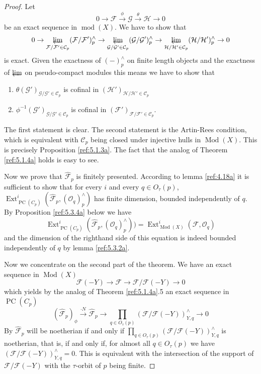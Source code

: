 \documentclass{amsproc}
\def\Cscr{{\mathcal C}}
\def\Fscr{{\mathcal F}}
\def\Gscr{{\mathcal G}}
\def\Hscr{{\mathcal H}}
\def\Oscr{{\mathcal O}}
\def\Ext{\operatorname {Ext}}
\def\coh{\operatorname {mod}}
\def\Qch{\operatorname {Mod}}
\def\r{\rightarrow}
\let\invlim\projlim
\DeclareMathOperator{\PC}{PC}
\theoremstyle{definition}
\theoremstyle{remark}
\def\invlim{\mathop{\vtop{\baselineskip -100pt\lineskip -1pt\lineskiplimit 0pt
\setbox0\hbox{\upshape lim}\copy0\hbox to \wd0{\leftarrowfill}}}\limits}
\numberwithin{equation}{section}
\numberwithin{table}{section}
\numberwithin{figure}{section}
\begin{document}
\begin{proof}
Let 
\[
0\r \Fscr\xrightarrow{\phi} \Gscr\xrightarrow{\theta} \Hscr\r 0
\]
be an exact sequence in $\coh(X)$. We have to show that 
\[
0\r \invlim_{\Fscr/\Fscr'\in\Cscr_p} (\Fscr/\Fscr')^\wedge_{p}
\r \invlim_{\Gscr/\Gscr'\in\Cscr_p} (\Gscr/\Gscr')^\wedge_{p}
\r \invlim_{\Hscr/\Hscr'\in\Cscr_p} (\Hscr/\Hscr')^\wedge_{p}
\r
0
\]
is exact. Given the exactness of $(-)^\wedge_{p}$ on finite length
objects and the exactness of $\invlim$ on pseudo-compact modules this means
we have to show that \begin{enumerate}
\item
$\theta(\Gscr')_{\Gscr/\Gscr'\in\Cscr_p}$ is cofinal in 
$(\Hscr')_{\Hscr/\Hscr'\in\Cscr_p}$
\item
$\phi^{-1}(\Gscr')_{\Gscr/\Gscr'\in\Cscr_p}$ is cofinal in
$(\Fscr')_{\Fscr/\Fscr'\in\Cscr_p}$.
\end{enumerate}
The first statement is clear. The
second statement is the Artin-Rees condition, which is equivalent
with $\Cscr_p$ being closed under injective hulls in $\Qch(X)$. This is
precisely Proposition \ref{ref:5.1.3a}.
The fact that the analog of Theorem \ref{ref:5.1.4a} holds is
easy to see.

Now we prove that $\hat{\Fscr}_p$ is finitely presented. According to lemma
\ref{ref:4.18a} it is sufficient to show that for every $i$ and every 
$q\in O_\tau(p)$, $\Ext^i_{\PC(C_p)}(\hat{\Fscr}_{p},(\Oscr_q)^\wedge_{p})$ has 
finite dimension,
bounded independently of $q$.  By Proposition \ref{ref:5.3.4a} 
below we have \[
\Ext^i_{\PC(C_p)}(\hat{\Fscr}_{p},(\Oscr_q)^\wedge_{p}))=
\Ext^i_{\Qch(X)}(\Fscr,\Oscr_q)
\]
and the dimension of the righthand side of this equation  is indeed
bounded independently of $q$ by lemma \ref{ref:5.3.2a}.


Now we concentrate on the second part of the theorem.  
We have an exact sequence in $\Qch(X)$
\[
 \Fscr(-Y)\r \Fscr\r \Fscr/\Fscr(-Y)\r 0
 \]
 which yields by the analog of Theorem \ref{ref:5.1.4a}.5 an exact
 sequence in $\PC(C_p)$
\[
(\hat{\Fscr}_{p})_\phi\xrightarrow{\cdot N}  
\hat{\Fscr}_{p} \r \prod_{q\in O_\tau(p)}(\Fscr/\Fscr(-Y))^\wedge_{Y,q}\r 0
\] By \cite[Prop 3.22]{VdBVG} $\hat{\Fscr}_{p}$
will be noetherian if and only if 
$\prod_{q\in O_\tau(p)}(\Fscr/\Fscr(-Y))^\wedge_{Y,q}$ is noetherian,
that is, if and only if, for almost all $q\in O_\tau(p)$ we have 
$(\Fscr/\Fscr(-Y))^\wedge_{Y,q}=0$. 
This is equivalent with the intersection
of the support of $\Fscr/\Fscr(-Y)$ with the $\tau$-orbit of $p$
being finite. \end{proof}
\end{document}
